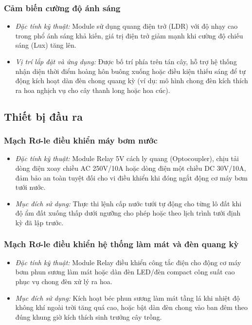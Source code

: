 \subsubsection{Cảm biến cường độ ánh sáng}
\begin{itemize}
    \item \textit{Đặc tính kỹ thuật:} Module sử dụng quang điện trở (LDR) với độ nhạy cao trong phổ ánh sáng khả kiến, giá trị điện trở giảm mạnh khi cường độ chiếu sáng (Lux) tăng lên.
    \item \textit{Vị trí lắp đặt và ứng dụng:} Được bố trí phía trên tán cây, hỗ trợ hệ thống nhận diện thời điểm hoàng hôn buông xuống hoặc điều kiện thiếu sáng để tự động kích hoạt dàn đèn chong quang kỳ (ví dụ: mô hình chong đèn kích thích ra hoa nghịch vụ cho cây thanh long hoặc hoa cúc).
\end{itemize}

\subsection{Thiết bị đầu ra}

\subsubsection{Mạch Rơ-le điều khiển máy bơm nước}
\begin{itemize}
    \item \textit{Đặc tính kỹ thuật:} Module Relay 5V cách ly quang (Optocoupler), chịu tải dòng điện xoay chiều AC 250V/10A hoặc dòng điện một chiều DC 30V/10A, đảm bảo an toàn tuyệt đối cho vi điều khiển khi đóng ngắt động cơ máy bơm tưới nước.
    \item \textit{Mục đích sử dụng:} Thực thi lệnh cấp nước tưới tự động cho từng lô đất khi độ ẩm đất xuống thấp dưới ngưỡng cho phép hoặc theo lịch trình tưới định kỳ đã lập trước.
\end{itemize}

\subsubsection{Mạch Rơ-le điều khiển hệ thống làm mát và đèn quang kỳ}
\begin{itemize}
    \item \textit{Đặc tính kỹ thuật:} Module Relay điều khiển công tắc điện cho động cơ máy bơm phun sương làm mát hoặc dàn đèn LED/đèn compact công suất cao phục vụ chong đèn xử lý ra hoa.
    \item \textit{Mục đích sử dụng:} Kích hoạt béc phun sương làm mát tầng lá khi nhiệt độ không khí ngoài trời tăng quá cao, hoặc bật dàn đèn chong vào ban đêm theo đúng khung giờ kích thích sinh trưởng cây trồng.
\end{itemize}


